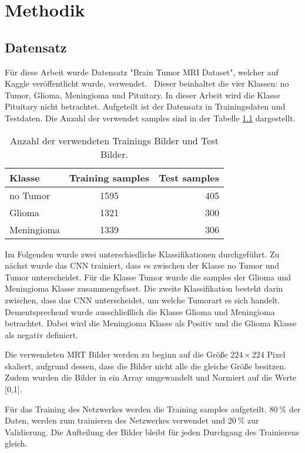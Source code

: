 \chapter{Methodik}

\section{Datensatz}
Für diese Arbeit wurde Datensatz "Brain Tumor MRI Dataset", welcher auf Kaggle veröffentlicht wurde, verwendet.~\cite{msoud_nickparvar_2021}
Dieser beinhaltet die vier Klassen: no Tumor, Glioma, Meningioma und Pituitary.
In dieser Arbeit wird die Klasse Pituitary nicht betrachtet.
Aufgeteilt ist der Datensatz in Trainingsdaten und Testdaten.
Die Anzahl der verwendet samples sind in der Tabelle \ref{tab:daten} dargestellt. 
\begin{table}[htbp]
    \centering
    \begin{tabular}{l c r}
        \hline
        Klasse      & Training samples & Test samples \\
        \hline
        no Tumor    &    1595          & 405 \\
        Glioma      &    1321          & 300 \\
        Meningioma  &    1339          & 306 \\
        \hline
  \end{tabular}
  \caption{Anzahl der verwendeten Trainings Bilder und Test Bilder.}
  \label{tab:daten}
\end{table}
Im Folgenden wurde zwei unterschiedliche Klassifikationen durchgeführt.
Zu nächst wurde das CNN trainiert, dass es zwischen der Klasse no Tumor und Tumor unterscheidet. Für die Klasse Tumor
wurde die samples der Glioma und Meningioma Klasse zusammengefasst.
Die zweite Klassifikation besteht darin zwischen, dass das CNN unterscheidet, um welche Tumorart es sich handelt.
Dementsprechend wurde ausschließlich die Klasse Glioma und Meningioma betrachtet.
Dabei wird die Meningioma Klasse als Positiv  und die Glioma Klasse als negativ definiert.

Die verwendeten MRT Bilder werden zu beginn auf die Größe $224 \times 224$ Pixel skaliert, aufgrund dessen, dass die Bilder nicht alle die 
gleiche Größe besitzen.
Zudem wurden die Bilder in ein Array umgewandelt und Normiert auf die Werte [0,1].

Für das Training des Netzwerkes werden die Training samples aufgeteilt. $\qty{80}{\%}$ der Daten, werden zum trainieren des Netzwerkes 
verwendet und $\qty{20}{\%}$ zur Validierung.
Die Aufteilung der Bilder bleibt für jeden Durchgang des Trainierens gleich.

